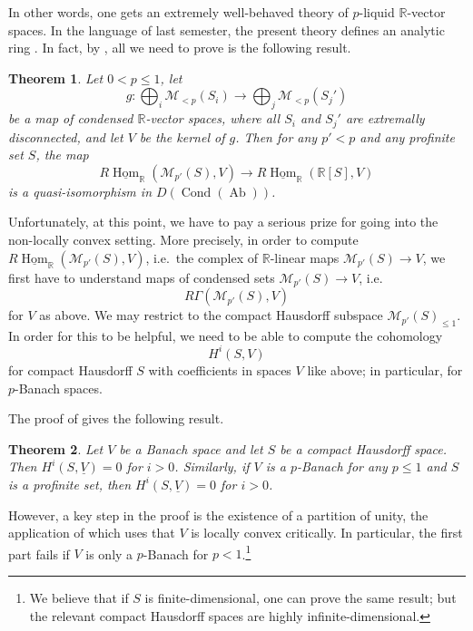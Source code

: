 \documentclass[11pt]{amsbook}
\DeclareMathOperator{\Hom}{Hom}
\newcommand{\intHom}{\underline{\Hom}}
\DeclareMathOperator{\Cond}{Cond}
\DeclareMathOperator{\Ab}{Ab}
\numberwithin{equation}{section}
\newtheorem{theorem}{Theorem}
\numberwithin{theorem}{section}
\theoremstyle{definition}
\begin{document}
In other words, one gets an extremely well-behaved theory of $p$-liquid $\mathbb R$-vector spaces. In the language of last semester, the present theory defines an analytic ring \cite[Definition 7.4, Proposition 7.5]{Condensed}. In fact, by \cite[Lemma 5.9, Remark 5.11]{Condensed}, all we need to prove is the following result.

\begin{theorem}\label{thm:keyreal} Let $0<p\leq 1$, let
\[
g: \bigoplus_i \mathcal M_{<p}(S_i)\to \bigoplus_j \mathcal M_{<p}(S_j')
\]
be a map of condensed $\mathbb R$-vector spaces, where all $S_i$ and $S_j'$ are extremally disconnected, and let $V$ be the kernel of $g$. Then for any $p'<p$ and any profinite set $S$, the map
\[
R\intHom_{\mathbb R}(\mathcal M_{p'}(S),V)\to R\intHom_{\mathbb R}(\mathbb R[S],V)
\]
is a quasi-isomorphism in $D(\Cond(\Ab))$.
\end{theorem}

Unfortunately, at this point, we have to pay a serious prize for going into the non-locally convex setting. More precisely, in order to compute $R\intHom_{\mathbb R}(\mathcal M_{p'}(S),V)$, i.e.~the complex of $\mathbb R$-linear maps $\mathcal M_{p'}(S)\to V$, we first have to understand maps of condensed sets $\mathcal M_{p'}(S)\to V$, i.e.~
\[
R\Gamma(\mathcal M_{p'}(S),V)
\]
for $V$ as above. We may restrict to the compact Hausdorff subspace $\mathcal M_{p'}(S)_{\leq 1}$. In order for this to be helpful, we need to be able to compute the cohomology
\[
H^i(S,V)
\]
for compact Hausdorff $S$ with coefficients in spaces $V$ like above; in particular, for $p$-Banach spaces.

The proof of \cite[Theorem 3.3]{Condensed} gives the following result.

\begin{theorem}\label{thm:pbanachcohom} Let $V$ be a Banach space and let $S$ be a compact Hausdorff space. Then $H^i(S,\underline{V})=0$ for $i>0$. Similarly, if $V$ is a $p$-Banach for any $p\leq 1$ and $S$ is a profinite set, then $H^i(S,\underline{V})=0$ for $i>0$.
\end{theorem}

However, a key step in the proof is the existence of a partition of unity, the application of which uses that $V$ is locally convex critically. In particular, the first part fails if $V$ is only a $p$-Banach for $p<1$.\footnote{We believe that if $S$ is finite-dimensional, one can prove the same result; but the relevant compact Hausdorff spaces are highly infinite-dimensional.}
\end{document}
